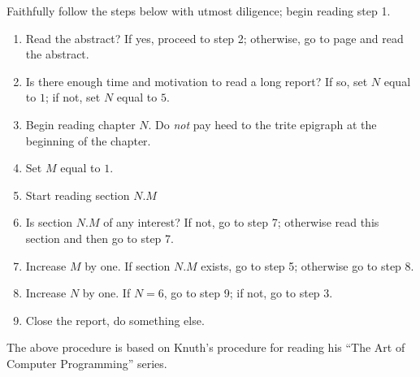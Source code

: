 \begin{preface}
 Faithfully follow the steps below with utmost diligence; begin reading step 1.

 \begin{enumerate}
 \item Read the abstract? If yes, proceed to step 2; otherwise, go to
   page \pageref{combox-abstract} and read the abstract.
 \item Is there enough time and motivation to read a long report? If
   so, set $N$ equal to $1$; if not, set $N$ equal to $5$.
 \item Begin reading chapter $N$. Do \emph{not} pay heed to the trite
   epigraph at the beginning of the chapter.
 \item Set $M$ equal to $1$.
 \item Start reading section $N.M$
 \item Is section $N.M$ of any interest? If not, go to step 7;
   otherwise read this section and then go to step 7.
 \item Increase $M$ by one. If section $N.M$ exists, go to step 5;
   otherwise go to step 8.
 \item Increase $N$ by one. If $N = 6$, go to step 9; if not, go to
   step 3.
\item Close the report, do something else.
 \end{enumerate}

 The above procedure is based on Knuth's procedure for reading his
 ``The Art of Computer Programming'' series\cite{knuth}.
\end{preface}
